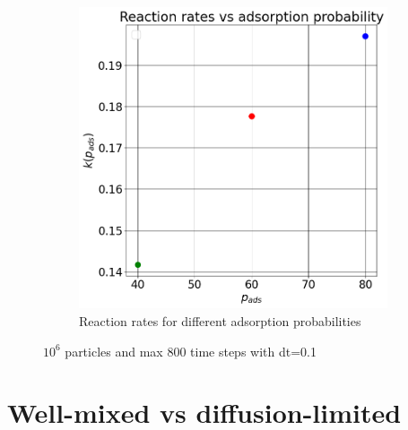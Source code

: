 \documentclass{article}
\begin{document}
\begin{figure}[htbp]
\begin{subfigure}[b]{0.48\textwidth}
        \includegraphics[width=\textwidth]{images/reactionVsProb.png}
        \caption{Reaction rates for different adsorption probabilities}
    \end{subfigure}
    \caption{$10^6$ particles and max 800 time steps with dt=0.1}
    \label{fig:reactionRatesProb}
\end{figure}

\FloatBarrier  %
\section{Well-mixed vs diffusion-limited}
\end{document}
